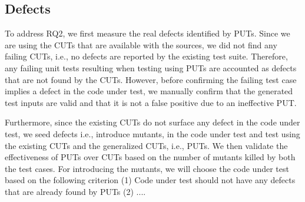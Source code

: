 \subsection{Defects}

To address RQ2, we first measure the real defects identified by PUTs. Since we are using the CUTs that are available with the sources, we did not find any failing CUTs, i.e., no defects are reported by the existing test suite. Therefore, any failing unit tests resulting when testing using PUTs are accounted as defects that are not found by the CUTs. However, before confirming the failing test case implies a defect in the code under test, we manually confirm that the generated test inputs are valid and that it is not a false positive due to an ineffective PUT. 

Furthermore, since the existing CUTs do not surface any defect in the code under test, we seed defects i.e., introduce mutants, in the code under test and test using the existing CUTs and the generalized CUTs, i.e., PUTs. We then validate the effectiveness of PUTs over CUTs based on the number of mutants killed by both the test cases. For introducing the mutants, we will choose the code under test based on the following criterion (1) Code under test should not have any defects that are already found by PUTs (2)  ....